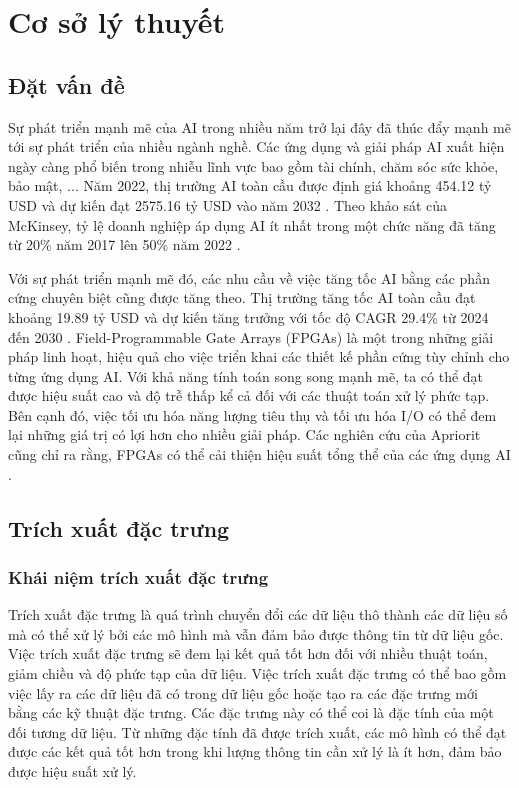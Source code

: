 \clearpage
{}

\setcounter{chapter}{0}
\chapter[{CƠ SỞ LÝ THUYẾT}]{Cơ sở lý thuyết}
\section{Đặt vấn đề}
Sự phát triển mạnh mẽ của AI trong nhiều năm trở lại đây đã thúc đẩy mạnh mẽ tới sự phát triển của nhiều ngành nghề. Các ứng dụng và giải pháp AI xuất hiện ngày càng phổ biến trong nhiễu lĩnh vực bao gồm tài chính, chăm sóc sức khỏe, bảo mật, ... Năm 2022, thị trường AI toàn cầu được định giá khoảng 454.12 tỷ USD và dự kiến đạt 2575.16 tỷ USD vào năm 2032 \cite{AIMARKET}. Theo khảo sát của McKinsey, tỷ lệ doanh nghiệp áp dụng AI ít nhất trong một chức năng đã tăng từ 20\% năm 2017 lên 50\% năm 2022 \cite{mckinsey}.

Với sự phát triển mạnh mẽ đó, các nhu cầu về việc tăng tốc AI bằng các phần cứng chuyên biệt cũng được tăng theo. Thị trường tăng tốc AI toàn cầu đạt khoảng 19.89 tỷ USD và dự kiến tăng trưởng với tốc độ CAGR 29.4\% từ 2024 đến 2030 \cite{aiaccelerator}. 
Field-Programmable Gate Arrays (FPGAs) là một trong những giải pháp linh hoạt, hiệu quả cho việc triển khai các thiết kế phần cứng tùy chỉnh cho từng ứng dụng AI. Với khả năng tính toán song song mạnh mẽ, ta có thể đạt được hiệu suất cao và độ trễ thấp kể cả đối với các thuật toán xử lý phức tạp. Bên cạnh đó, việc tối ưu hóa năng lượng tiêu thụ và tối ưu hóa I/O có thể đem lại những giá trị có lợi hơn cho nhiều giải pháp. Các nghiên cứu của Apriorit cũng chỉ ra rằng, FPGAs có thể cải thiện hiệu suất tổng thể của các ứng dụng AI \cite{apriorit}.
\section{Trích xuất đặc trưng}
\subsection{Khái niệm trích xuất đặc trưng}
Trích xuất đặc trưng là quá trình chuyển đổi các dữ liệu thô thành các dữ liệu số mà có thể xử lý bởi các mô hình mà vẫn đảm bảo được thông tin từ dữ liệu gốc. Việc trích xuất đặc trưng sẽ đem lại kết quả tốt hơn đối với nhiều thuật toán, giảm chiều và độ phức tạp của dữ liệu. Việc trích xuất đặc trưng có thể bao gồm việc lấy ra các dữ liệu đã có trong dữ liệu gốc hoặc tạo ra các đặc trưng mới bằng các kỹ thuật đặc trưng. Các đặc trưng này có thể coi là đặc tính của một đối tương dữ liệu. Từ những đặc tính đã được trích xuất, các mô hình có thể đạt được các kết quả tốt hơn trong khi lượng thông tin cần xử lý là ít hơn, đảm bảo được hiệu suất xử lý. 


